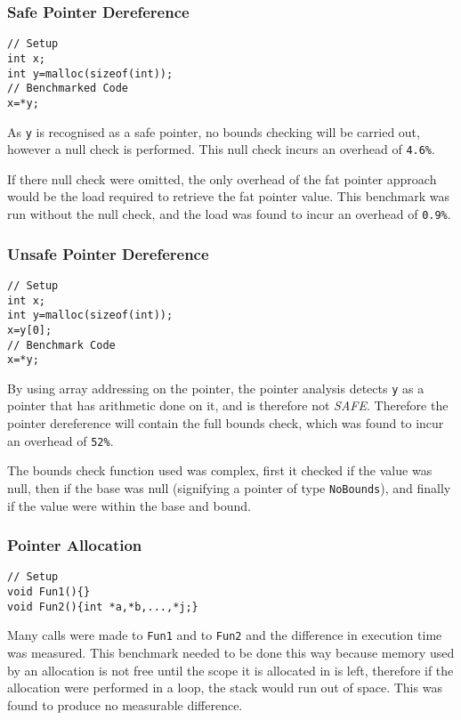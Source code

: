 \subsubsection{Safe Pointer Dereference}

\begin{verbatim}
// Setup
int x;
int y=malloc(sizeof(int));
// Benchmarked Code
x=*y;
\end{verbatim}

As \verb!y! is recognised as a safe pointer, no bounds checking will be carried out, however a null check is performed.
This null check incurs an overhead of \verb!4.6%!.

If there null check were omitted, the only overhead of the fat pointer approach would be the load required to retrieve the fat pointer value.
This benchmark was run without the null check, and the load was found to incur an overhead of \verb!0.9%!.

\subsubsection{Unsafe Pointer Dereference}

\begin{verbatim}
// Setup
int x;
int y=malloc(sizeof(int));
x=y[0];
// Benchmark Code
x=*y;
\end{verbatim}

By using array addressing on the pointer, the pointer analysis detects \verb!y! as a pointer that has arithmetic done on it, and is therefore not \textit{SAFE}.
Therefore the pointer dereference will contain the full bounds check, which was found to incur an overhead of \verb!52%!.

The bounds check function used was complex, first it checked if the value was null, then if the base was null (signifying a pointer of type \verb!NoBounds!), and finally if the value were within the base and bound.

\subsubsection{Pointer Allocation}

\begin{verbatim}
// Setup
void Fun1(){}
void Fun2(){int *a,*b,...,*j;}
\end{verbatim}

Many calls were made to \verb!Fun1! and to \verb!Fun2! and the difference in execution time was measured.
This benchmark needed to be done this way because memory used by an allocation is not free until the scope it is allocated in is left, therefore if the allocation were performed in a loop, the stack would run out of space.
This was found to produce no measurable difference.


